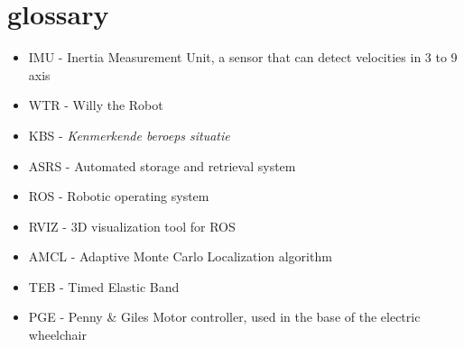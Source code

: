\section{glossary}
\begin{itemize}
\item \label{trm::imu} IMU - Inertia Measurement Unit, a sensor that can detect velocities in 3 to 9 axis
\item \label{trm::wtr} WTR - Willy the Robot
\item \label{trm::kbs} KBS - \textit{Kenmerkende beroeps situatie}
\item \label{trm::asrs} ASRS - Automated storage and retrieval system
\item \label{trm::ros} ROS - Robotic operating system
\item \label{trm::rviz} RVIZ - 3D visualization tool for ROS
\item \label{trm::amcl} AMCL - Adaptive Monte Carlo Localization algorithm
\item \label{trm::teb} TEB - Timed Elastic Band
\item \label{trm::PGE} PGE - Penny \& Giles Motor controller, used in the base of the electric wheelchair
\end{itemize}